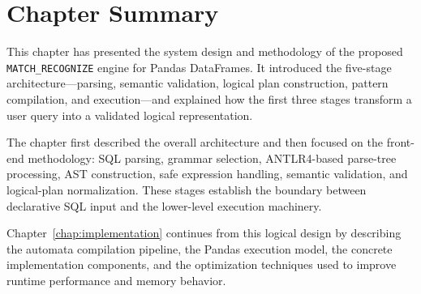 \section{Chapter Summary}
\label{sec:meth-summary}

This chapter has presented the system design and methodology of the
proposed \texttt{MATCH\_RECOGNIZE} engine for Pandas DataFrames.  It
introduced the five-stage architecture---parsing, semantic
validation, logical plan construction, pattern compilation, and
execution---and explained how the first three stages transform a
user query into a validated logical representation.

The chapter first described the overall architecture and then focused
on the front-end methodology: SQL parsing, grammar selection,
ANTLR4-based parse-tree processing, AST construction, safe expression
handling, semantic validation, and logical-plan normalization.  These
stages establish the boundary between declarative SQL input and the
lower-level execution machinery.

Chapter~\ref{chap:implementation} continues from this logical design
by describing the automata compilation pipeline, the Pandas execution
model, the concrete implementation components, and the optimization
techniques used to improve runtime performance and memory behavior.
